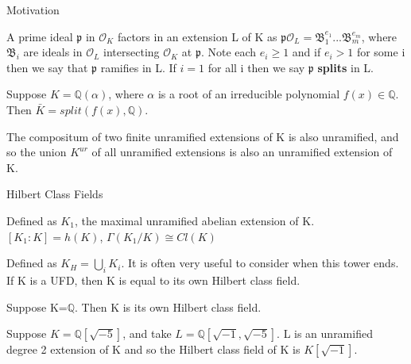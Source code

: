 \documentclass[10pt]{beamer}
\theoremstyle{plain} %
\begin{document}
\begin{frame}{Motivation}
\begin{definition}[Ramification]
A prime ideal $\mathfrak{p}$ in $\mathcal{O}_K$ factors in an extension L of K as
$\mathfrak{p}\mathcal{O}_L=\mathfrak{B}_1^{e_1}...\mathfrak{B}_m^{e_m}$, where $\mathfrak{B}_i$ are ideals in $\mathcal{O}_L$ intersecting $\mathcal{O}_K$ at $\mathfrak{p}$. Note each $e_i\geq1$ and if $e_i>1$ for some i then we say that $\mathfrak{p}$ ramifies in L. If $i=1$ for all i then we say $\mathfrak{p}$ \textbf{splits} in L.
\end{definition}
\begin{theorem}
  Suppose $K=\mathbb{Q}(\alpha)$, where $\alpha$ is a root of an irreducible polynomial $f(x) \in \mathbb{Q}$. Then $\bar{K} = split(f(x),\mathbb{Q})$.
\end{theorem}
    \begin{theorem}
The compositum of two finite unramified extensions of K is also unramified, and so the union $K^{ur}$ of all unramified extensions is also an unramified extension of K.
\end{theorem}

\end{frame}
\begin{frame}{Hilbert Class Fields}
\begin{definition}
Defined as $K_1$, the maximal unramified abelian extension of K. $[K_1:K]=h(K)$, $\Gamma(K_1/K)\cong Cl(K)$
\end{definition}
  \begin{definition}
Defined as $K_H=\bigcup_{i}K_{i}$. It is often very useful to consider when this tower ends. If K is a UFD, then K is equal to its own Hilbert class field.  
\end{definition}
    \begin{example}
    Suppose K=$\mathbb{Q}$. Then K is its own Hilbert class field. 
\end{example}
\begin{example}
    Suppose $K=\mathbb{Q}[\sqrt{-5}]$, and take $L=\mathbb{Q}[\sqrt{-1},\sqrt{-5}]$. L is an unramified degree 2 extension of K and so the Hilbert class field of K is $K[\sqrt{-1}]$.
\end{example}

\end{frame}
\end{document}
